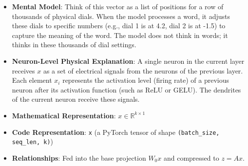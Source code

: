 \documentclass{article}
\begin{document}
\begin{enumerate}
\begin{itemize}
\begin{center}
\begin{adjustbox}{max width=0.85\linewidth}
\end{adjustbox}
\vspace{1.5em}
\end{center}

      \item \textbf{Mental Model}: Think of this vector as a list of positions for a row of thousands of physical dials. When the model processes a word, it adjusts these dials to specific numbers (e.g., dial 1 is at 4.2, dial 2 is at -1.5) to capture the meaning of the word. The model does not think in words; it thinks in these thousands of dial settings.
      \item \textbf{Neuron-Level Physical Explanation}: A single neuron in the current layer receives $x$ as a set of electrical signals from the neurons of the previous layer. Each element $x_i$ represents the activation level (firing rate) of a previous neuron after its activation function (such as ReLU or GELU). The dendrites of the current neuron receive these signals.
      \item \textbf{Mathematical Representation}: $x \in \mathbb{R}^{k \times 1}$
      \item \textbf{Code Representation}: \texttt{x} (a PyTorch tensor of shape \texttt{(batch\_size, seq\_len, k)})
      \item \textbf{Relationships}: Fed into the base projection $W_0 x$ and compressed to $z = Ax$.
    \end{itemize}


\end{enumerate}
\end{document}
